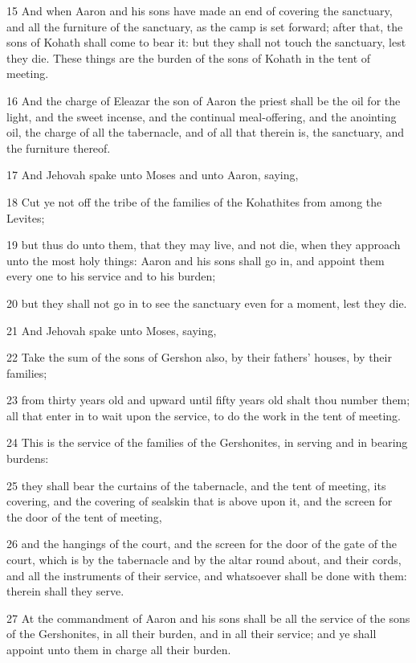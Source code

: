 \par 15 And when Aaron and his sons have made an end of covering the sanctuary, and all the furniture of the sanctuary, as the camp is set forward; after that, the sons of Kohath shall come to bear it: but they shall not touch the sanctuary, lest they die. These things are the burden of the sons of Kohath in the tent of meeting.
\par 16 And the charge of Eleazar the son of Aaron the priest shall be the oil for the light, and the sweet incense, and the continual meal-offering, and the anointing oil, the charge of all the tabernacle, and of all that therein is, the sanctuary, and the furniture thereof.
\par 17 And Jehovah spake unto Moses and unto Aaron, saying,
\par 18 Cut ye not off the tribe of the families of the Kohathites from among the Levites;
\par 19 but thus do unto them, that they may live, and not die, when they approach unto the most holy things: Aaron and his sons shall go in, and appoint them every one to his service and to his burden;
\par 20 but they shall not go in to see the sanctuary even for a moment, lest they die.
\par 21 And Jehovah spake unto Moses, saying,
\par 22 Take the sum of the sons of Gershon also, by their fathers' houses, by their families;
\par 23 from thirty years old and upward until fifty years old shalt thou number them; all that enter in to wait upon the service, to do the work in the tent of meeting.
\par 24 This is the service of the families of the Gershonites, in serving and in bearing burdens:
\par 25 they shall bear the curtains of the tabernacle, and the tent of meeting, its covering, and the covering of sealskin that is above upon it, and the screen for the door of the tent of meeting,
\par 26 and the hangings of the court, and the screen for the door of the gate of the court, which is by the tabernacle and by the altar round about, and their cords, and all the instruments of their service, and whatsoever shall be done with them: therein shall they serve.
\par 27 At the commandment of Aaron and his sons shall be all the service of the sons of the Gershonites, in all their burden, and in all their service; and ye shall appoint unto them in charge all their burden.
